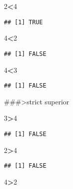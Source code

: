 \documentclass[
]{article}
\newenvironment{Shaded}{\begin{snugshade}}{\end{snugshade}}
\newcommand{\DecValTok}[1]{\textcolor[rgb]{0.00,0.00,0.81}{#1}}
\newcommand{\SpecialCharTok}[1]{\textcolor[rgb]{0.81,0.36,0.00}{\textbf{#1}}}
\begin{document}
\begin{Shaded}
\begin{Highlighting}[]
\DecValTok{2}\SpecialCharTok{\textless{}}\DecValTok{4} 
\end{Highlighting}
\end{Shaded}

\begin{verbatim}
## [1] TRUE
\end{verbatim}

\begin{Shaded}
\begin{Highlighting}[]
\DecValTok{4}\SpecialCharTok{\textless{}}\DecValTok{2}
\end{Highlighting}
\end{Shaded}

\begin{verbatim}
## [1] FALSE
\end{verbatim}

\begin{Shaded}
\begin{Highlighting}[]
\DecValTok{4}\SpecialCharTok{\textless{}}\DecValTok{3}
\end{Highlighting}
\end{Shaded}

\begin{verbatim}
## [1] FALSE
\end{verbatim}

\#\#\#\textgreater strict superior

\begin{Shaded}
\begin{Highlighting}[]
\DecValTok{3}\SpecialCharTok{\textgreater{}}\DecValTok{4} 
\end{Highlighting}
\end{Shaded}

\begin{verbatim}
## [1] FALSE
\end{verbatim}

\begin{Shaded}
\begin{Highlighting}[]
\DecValTok{2}\SpecialCharTok{\textgreater{}}\DecValTok{4} 
\end{Highlighting}
\end{Shaded}

\begin{verbatim}
## [1] FALSE
\end{verbatim}

\begin{Shaded}
\begin{Highlighting}[]
\DecValTok{4}\SpecialCharTok{\textgreater{}}\DecValTok{2}
\end{Highlighting}
\end{Shaded}
\end{document}
